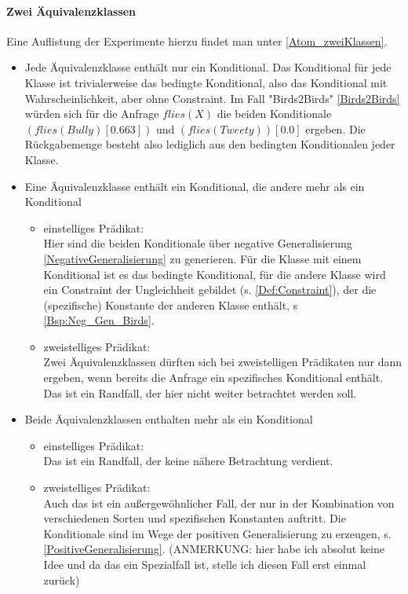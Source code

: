 \documentclass[a4paper, 11pt]{book}
\begin{document}
\paragraph{ Zwei Äquivalenzklassen}
Eine Auflistung der  Experimente hierzu findet man unter \ref{Atom_zweiKlassen}.
\begin{itemize}
\item Jede Äquivalenzklasse enthält nur ein Konditional. Das Konditional für jede Klasse ist trivialerweise das bedingte Konditional, also das Konditional mit Wahrscheinlichkeit, aber ohne Constraint. Im Fall "{}Birds2Birds"{} \ref{Birds2Birds} würden sich für die Anfrage $flies(X)$ die beiden Konditionale $ (flies(Bully)[0.663]) $ und $ (flies(Tweety))[0.0] $ ergeben. Die Rückgabemenge besteht also lediglich aus den bedingten Konditionalen jeder Klasse.
\item Eine Äquivalenzklasse enthält ein Konditional, die andere mehr als ein Konditional
\begin{itemize}
	\item einstelliges Prädikat:\\
	Hier sind die beiden Konditionale über negative Generalisierung \ref{NegativeGeneralisierung} zu generieren. Für die Klasse mit einem Konditional ist es das bedingte Konditional, für die andere Klasse wird ein Constraint der Ungleichheit gebildet (s. \ref{Def:Constraint}), der die (spezifische) Konstante der anderen Klasse enthält, s \ref{Bsp:Neg_Gen_Birds}. 
	\item zweistelliges Prädikat:\\
	Zwei Äquivalenzklassen dürften sich bei zweistelligen Prädikaten nur dann ergeben, wenn bereits die Anfrage ein spezifisches Konditional enthält. Das ist ein Randfall, der hier nicht weiter betrachtet werden soll. 
\end{itemize}
\item Beide Äquivalenzklassen enthalten mehr als ein Konditional
\begin{itemize}
	\item {einstelliges Prädikat:}\\
	Das ist ein Randfall, der keine nähere Betrachtung verdient.
	\item zweistelliges Prädikat:\\
	Auch das ist ein außergewöhnlicher Fall, der nur in der Kombination von verschiedenen Sorten und spezifischen Konstanten auftritt. Die Konditionale sind im Wege der positiven Generalisierung zu erzeugen, s. \ref{PositiveGeneralisierung}.
	(ANMERKUNG: hier habe ich absolut keine Idee und da das ein Spezialfall ist, stelle ich diesen Fall erst einmal zurück)
\end{itemize}
\end{itemize}
\end{document}
